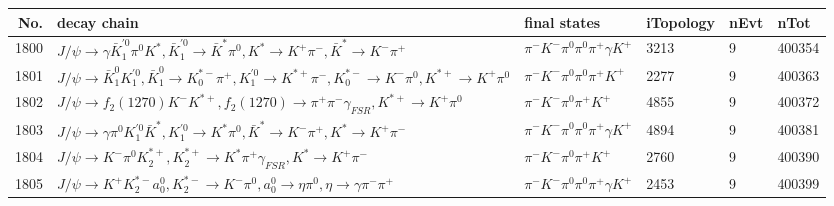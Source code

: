 \begin{table}[htbp] 
\begin{center}
\begin{small}
\begin{tabular}{rlllll}\hline\hline
 No. & decay chain & final states &  iTopology & nEvt & nTot \\\hline
1800&$J/\psi       \rightarrow \gamma       \bar{K}_1^{'0}\pi^{0}        K^{*}          , \bar{K}_1^{'0} \rightarrow \bar{K}^{*}   \pi^{0}        , K^{*}           \rightarrow K^{+}          \pi^{-}        , \bar{K}^{*}    \rightarrow K^{-}          \pi^{+}        $&$\pi^{-}        K^{-}          \pi^{0}        \pi^{0}        \pi^{+}        \gamma       K^{+}          $& 3213&    9&400354\\
1801&$J/\psi       \rightarrow \bar{K}_1^{0} K_1^{'0}      , \bar{K}_1^{0}  \rightarrow K_{0}^{*-}     \pi^{+}        , K_1^{'0}       \rightarrow K^{*+}         \pi^{-}        , K_{0}^{*-}      \rightarrow K^{-}          \pi^{0}        , K^{*+}          \rightarrow K^{+}          \pi^{0}        $&$\pi^{-}        K^{-}          \pi^{0}        \pi^{0}        \pi^{+}        K^{+}          $& 2277&    9&400363\\
1802&$J/\psi       \rightarrow f_{2}(1270)    K^{-}          K^{*+}         , f_{2}(1270)     \rightarrow \pi^{+}        \pi^{-}        \gamma_{FSR} , K^{*+}          \rightarrow K^{+}          \pi^{0}        $&$\pi^{-}        K^{-}          \pi^{0}        \pi^{+}        K^{+}          $& 4855&    9&400372\\
1803&$J/\psi       \rightarrow \gamma       \pi^{0}        K_1^{'0}      \bar{K}^{*}   , K_1^{'0}       \rightarrow K^{*}          \pi^{0}        , \bar{K}^{*}    \rightarrow K^{-}          \pi^{+}        , K^{*}           \rightarrow K^{+}          \pi^{-}        $&$\pi^{-}        K^{-}          \pi^{0}        \pi^{0}        \pi^{+}        \gamma       K^{+}          $& 4894&    9&400381\\
1804&$J/\psi       \rightarrow K^{-}          \pi^{0}        K_2^{*+}       , K_2^{*+}        \rightarrow K^{*}          \pi^{+}        \gamma_{FSR} , K^{*}           \rightarrow K^{+}          \pi^{-}        $&$\pi^{-}        K^{-}          \pi^{0}        \pi^{+}        K^{+}          $& 2760&    9&400390\\
1805&$J/\psi       \rightarrow K^{+}          K_2^{*-}       a_{0}^{0}      , K_2^{*-}        \rightarrow K^{-}          \pi^{0}        , a_{0}^{0}       \rightarrow \eta          \pi^{0}        , \eta           \rightarrow \gamma       \pi^{-}        \pi^{+}        $&$\pi^{-}        K^{-}          \pi^{0}        \pi^{0}        \pi^{+}        \gamma       K^{+}          $& 2453&    9&400399\\

\end{tabular}
\end{small}
\end{center}
\end{table}

